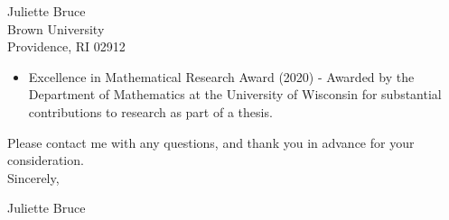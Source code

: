 \documentclass[11pt]{brownletter}
\begin{document}
\begin{letter}{Juliette Bruce\\ 
               Brown University\\ 
               Providence, RI 02912}
\begin{itemize}
\item Excellence in Mathematical Research Award (2020) - Awarded by the Department of Mathematics at the University of Wisconsin for substantial contributions to research as part of a thesis. 

\end{itemize}

Please contact me with any questions, and thank you in advance for your consideration.
\vspace{.1 in}
\\
Sincerely,

\vspace{.3 in}
Juliette Bruce




\end{letter}
\end{document}
